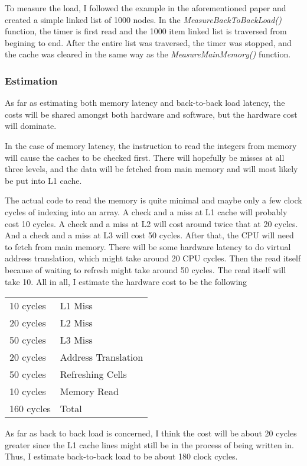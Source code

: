 \documentclass[paper=a4, fontsize=11pt]{scrartcl}
\numberwithin{equation}{section}        %
\numberwithin{figure}{section}          %
\numberwithin{table}{section}               %
\begin{document}
To measure the load, I followed the example in the aforementioned paper and created a simple linked list of 1000 nodes.  In the \textit{MeasureBackToBackLoad()} function, the timer is first read and the 1000 item linked list is traversed from begining to end.  After the entire list was traversed, the timer was stopped, and the cache was cleared in the same way as the \textit{MeasureMainMemory()} function.

\subsubsection{Estimation}

As far as estimating both memory latency and back-to-back load latency, the costs will be shared amongst both hardware and software, but the hardware cost will dominate.

In the case of memory latency, the instruction to read the integers from memory will cause the caches to be checked first.  There will hopefully be misses at all three levels, and the data will be fetched from main memory and will most likely be put into L1 cache.

The actual code to read the memory is quite minimal and maybe only a few clock cycles of indexing into an array.  A check and a miss at L1 cache will probably cost 10 cycles.  A check and a miss at L2 will cost around twice that at 20 cycles.  And a check and a miss at L3 will cost 50 cycles.  After that, the CPU will need to fetch from main memory.  There will be some hardware latency to do virtual address translation, which might take around 20 CPU cycles.  Then the read itself because of waiting to refresh might take around 50 cycles.  The read itself will take 10.  All in all, I estimate the hardware cost to be the following

\begin{center}
\begin{tabular}{ l|l }
  10 cycles & L1 Miss \\
  20 cycles & L2 Miss \\
  50 cycles & L3 Miss \\
  20 cycles & Address Translation \\
  50 cycles & Refreshing Cells \\
  10 cycles & Memory Read \\
  \hline
  160 cycles & Total
\end{tabular}
\end{center}

As far as back to back load is concerned, I think the cost will be about 20 cycles greater since the L1 cache lines might still be in the process of being written in.  Thus, I estimate back-to-back load to be about 180 clock cycles.
\end{document}
